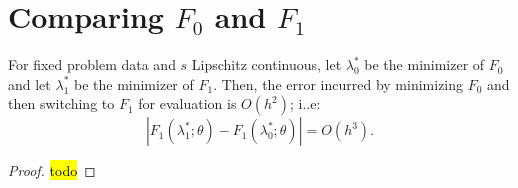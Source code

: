 \documentclass[eikonal.tex]{subfiles}
\begin{document}
\section{Comparing $F_0$ and $F_1$}

\begin{theorem}
  For fixed problem data and $s$ Lipschitz continuous, let
  $\lambda_0^*$ be the minimizer of $F_0$ and let $\lambda_1^*$ be the
  minimizer of $F_1$. Then, the error incurred by minimizing $F_0$ and
  then switching to $F_1$ for evaluation is $O(h^2)$; i..e:
  \begin{equation}
    |F_1(\lambda_1^*; \theta) - F_1(\lambda_0^*; \theta)| = O(h^3).
  \end{equation}
\end{theorem}

\begin{proof}
  \hl{todo}
\end{proof}
\end{document}
